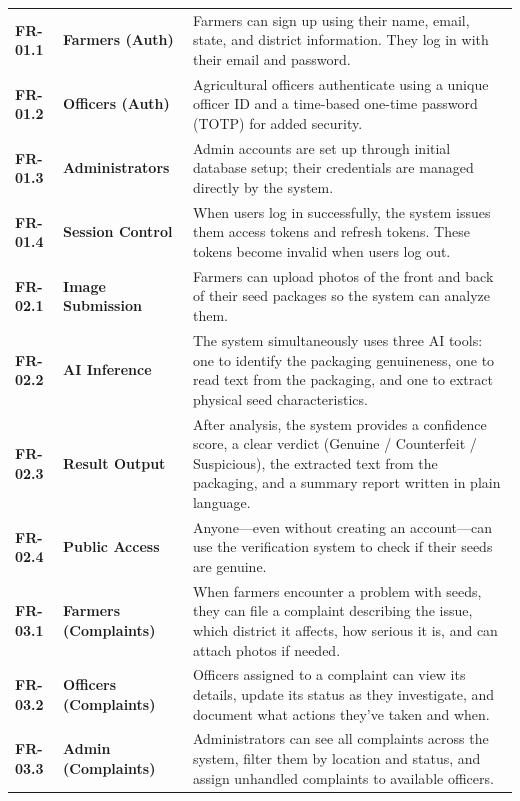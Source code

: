 \begin{longtable}{@{} p{2.0cm} p{3.2cm} >{\raggedright\arraybackslash}p{8.2cm} @{}}
\textbf{FR-01.1} & \textbf{Farmers (Auth)} & Farmers can sign up using their name, email, state, and district information. They log in with their email and password. \\
\addlinespace
\textbf{FR-01.2} & \textbf{Officers (Auth)} & Agricultural officers authenticate using a unique officer ID and a time-based one-time password (TOTP) for added security. \\
\addlinespace
\textbf{FR-01.3} & \textbf{Administrators} & Admin accounts are set up through initial database setup; their credentials are managed directly by the system. \\
\addlinespace
\textbf{FR-01.4} & \textbf{Session Control} & When users log in successfully, the system issues them access tokens and refresh tokens. These tokens become invalid when users log out. \\
\midrule
\textbf{FR-02.1} & \textbf{Image Submission} & Farmers can upload photos of the front and back of their seed packages so the system can analyze them. \\
\addlinespace
\textbf{FR-02.2} & \textbf{AI Inference} & The system simultaneously uses three AI tools: one to identify the packaging genuineness, one to read text from the packaging, and one to extract physical seed characteristics. \\
\addlinespace
\textbf{FR-02.3} & \textbf{Result Output} & After analysis, the system provides a confidence score, a clear verdict (Genuine / Counterfeit / Suspicious), the extracted text from the packaging, and a summary report written in plain language. \\
\addlinespace
\textbf{FR-02.4} & \textbf{Public Access} & Anyone—even without creating an account—can use the verification system to check if their seeds are genuine. \\
\midrule
\textbf{FR-03.1} & \textbf{Farmers (Complaints)} & When farmers encounter a problem with seeds, they can file a complaint describing the issue, which district it affects, how serious it is, and can attach photos if needed. \\
\addlinespace
\textbf{FR-03.2} & \textbf{Officers (Complaints)} & Officers assigned to a complaint can view its details, update its status as they investigate, and document what actions they've taken and when. \\
\addlinespace
\textbf{FR-03.3} & \textbf{Admin (Complaints)} & Administrators can see all complaints across the system, filter them by location and status, and assign unhandled complaints to available officers. \\

\end{longtable}
